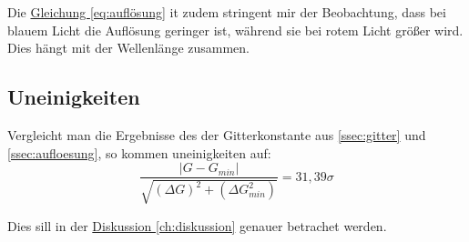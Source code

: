 Die \hyperref[eq:auflösung]{Gleichung \ref*{eq:auflösung}} it zudem stringent mir der Beobachtung, dass bei blauem Licht die Auflösung geringer ist, während sie bei rotem Licht größer wird. Dies hängt mit der Wellenlänge zusammen.

\subsection*{Uneinigkeiten}

Vergleicht man die Ergebnisse des der Gitterkonstante aus \ref{ssec:gitter} und \ref{ssec:aufloesung}, so kommen uneinigkeiten auf:
\begin{equation}
 \frac{\left| G - G_{min} \right|}{\sqrt{(\Delta G)^2 + (\Delta G_{min}^2)}} = 31,39\sigma
\end{equation}

Dies sill in der \hyperref[ch:diskussion]{Diskussion \ref*{ch:diskussion}} genauer betrachet werden.